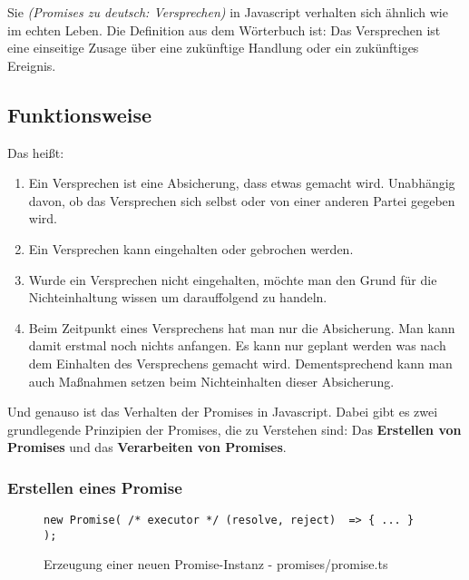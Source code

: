 \noindent
Sie \textit{(\glqq{}Promises\grqq{} zu deutsch: Versprechen)} in Javascript verhalten sich ähnlich wie im echten Leben. Die Definition aus dem Wörterbuch ist: Das Versprechen ist eine einseitige Zusage über eine zukünftige Handlung oder ein zukünftiges Ereignis. \cite{versprechen} \\

\subsection{Funktionsweise}

Das heißt:

\begin{enumerate}
    \item Ein Versprechen ist eine Absicherung, dass etwas gemacht wird. Unabhängig davon, ob das Versprechen sich selbst oder von einer anderen Partei gegeben wird.
    
    \item Ein Versprechen kann eingehalten oder gebrochen werden.
    
    \item Wurde ein Versprechen nicht eingehalten, möchte man den Grund für die Nichteinhaltung wissen um darauffolgend zu handeln.
    
    \item Beim Zeitpunkt eines Versprechens hat man nur die Absicherung. Man kann damit erstmal noch nichts anfangen. Es kann nur geplant werden was nach dem Einhalten des Versprechens gemacht wird. Dementsprechend kann man auch Maßnahmen setzen beim Nichteinhalten dieser Absicherung.
    
\end{enumerate}

\noindent
Und genauso ist das Verhalten der Promises in Javascript. Dabei gibt es zwei grundlegende Prinzipien der Promises, die zu Verstehen sind: Das \textbf{Erstellen von Promises} und das \textbf{Verarbeiten von Promises}.

\subsubsection{Erstellen eines Promise}

\begin{figure}[H]
\begin{lstlisting}
new Promise( /* executor */ (resolve, reject)  => { ... } );
\end{lstlisting}
\caption{Erzeugung einer neuen Promise-Instanz - promises/promise.ts}
\end{figure}

